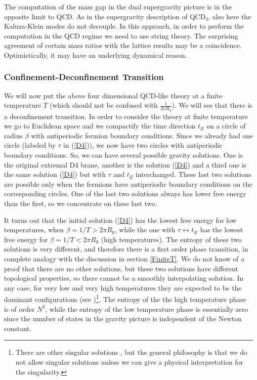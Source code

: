 The computation of the mass gap in the dual supergravity picture is in
the opposite limit to QCD.  As in the supergravity description of
QCD$_3$, also here the Kaluza-Klein modes do not decouple.  In this
approach, in order to perform the computation in the QCD regime we
need to use string theory.  The surprising agreement of certain mass
ratios with the lattice results may be a coincidence. Optimistically,
it may have an underlying dynamical reason.

\subsubsection{Confinement-Deconfinement Transition}

We will now put the above four dimensional QCD-like theory 
at a finite temperature $T$ (which should not be confused with $\frac{1}
{2 \pi R_0}$).
We will  see that there is a deconfinement transition. 
In order to consider the theory at finite temperature we go to Euclidean
space and we compactify the time direction $t_E$ on a circle of radius 
$\beta$ with antiperiodic fermion 
boundary conditions. Since we already had
one circle (labeled by $\tau$ in (\ref{D4})), we now have two circles
with antiperiodic boundary conditions. So, we can have several possible
gravity solutions. One is the original extremal D4 brane, another
is the solution  (\ref{D4}) and a third one is the same solution
 (\ref{D4}) but with $\tau$ and $t_E$ interchanged. 
These last two solutions are possible only when the fermions have
antiperiodic boundary conditions on the corresponding circles. 
One of the last two solutions always has lower free energy than 
the first, so we concentrate on these last two.
 
It turns out that the initial solution (\ref{D4}) has the lowest free
energy for low temperatures, when $\beta = 1/T > 2 \pi R_0$,
 while the one with 
 $\tau \leftrightarrow t_E$  has the lowest free energy for 
$\beta = 1/T < 2 \pi R_0$ (high temperatures). 
The entropy of these two solutions is very different, and therefore
there is a first order phase transition, in complete analogy with
the discussion in section \ref{FiniteT}.
We do not know of a proof that there are no other solutions, but 
these two solutions have different topological properties, so
there cannot be a smoothly interpolating solution. In any case,
for very low and very high temperatures they are expected to be
the dominant configurations (see \cite{Horowitz:1999ha})\footnote{
There are other singular solutions  
 \cite{Russo:1998ze},
 but the general philosophy
is that we do not  allow singular solutions unless we can give a 
physical interpretation for the singularity.}.
 The entropy of the 
the high  temperature  phase is of order $N^2$, while the entropy of the 
low temperature  phase is essentially zero since the number of states in
the gravity picture 
is independent of the Newton constant. 


